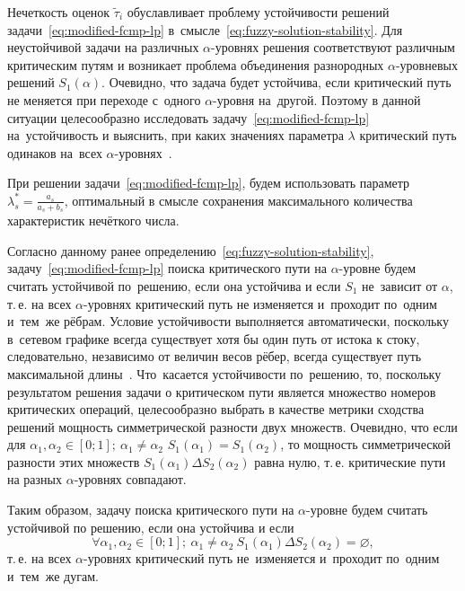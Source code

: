 Нечеткость оценок $\tilde{\tau}_i$ обуславливает проблему устойчивости решений задачи~\eqref{eq:modified-fcmp-lp} в~смысле~\eqref{eq:fuzzy-solution-stability}. Для неустойчивой задачи на различных $\alpha $-уровнях решения соответствуют различным критическим путям и возникает проблема объединения разнородных $\alpha$-уровневых решений $S_1\left(\alpha \right)$. Очевидно, что задача будет устойчива, если критический путь не меняется при переходе с~одного $\alpha$-уровня на~другой. Поэтому в данной ситуации целесообразно исследовать задачу~\eqref{eq:modified-fcmp-lp} на~устойчивость и выяснить, при каких значениях параметра $\lambda$ критический путь одинаков на~всех $\alpha$-уровнях~\cite{Vorontsov_VSTU}. 

При решении задачи~\eqref{eq:modified-fcmp-lp}, будем использовать параметр $\displaystyle \lambda_{s}^{*}=\frac{a_s}{a_s+b_s}$, оптимальный в смысле сохранения максимального количества характеристик нечёткого числа.

Согласно данному ранее определению~\eqref{eq:fuzzy-solution-stability}, задачу~\eqref{eq:modified-fcmp-lp} поиска критического пути на $\alpha$-уровне будем считать устойчивой по~решению, если она устойчива и если $S_1$ не~зависит от $\alpha$, т.\,е. на всех $\alpha$-уровнях критический путь не изменяется и~проходит по~одним и~тем~же рёбрам. Условие устойчивости выполняется автоматически, поскольку в~сетевом графике всегда существует хотя бы один путь от истока к стоку, следовательно, независимо от величин весов рёбер, всегда существует путь максимальной длины~\cite{Kormen}. Что~касается устойчивости по~решению, то, поскольку результатом решения задачи о критическом пути является множество номеров критических операций, целесообразно выбрать в качестве метрики сходства решений мощность симметрической разности двух множеств. Очевидно, что если для $\alpha_1, \alpha_2 \in \left[ 0;1 \right];\ \alpha_1\ne \alpha_2$ $S_1\left( \alpha_1 \right)=S_1\left(\alpha_2 \right)$, то мощность симметрической разности этих множеств $S_1\left( \alpha_1 \right)\Delta S_2\left(\alpha_2 \right)$ равна нулю, т.\,е. критические пути на разных $\alpha$-уровнях совпадают.

Таким образом, задачу поиска критического пути на $\alpha $-уровне будем считать устойчивой по решению, если она устойчива и если 
\begin{equation*}
  \forall \alpha_1, \alpha_2\in \left[ 0;1 \right];\ \alpha_1\ne \alpha_2\ S_1\left(\alpha_1 \right)\Delta S_2\left(\alpha_2 \right)=\varnothing,
\end{equation*}
т.\,е. на всех $\alpha $-уровнях критический путь не~изменяется и~проходит по~одним и~тем~же дугам. 

